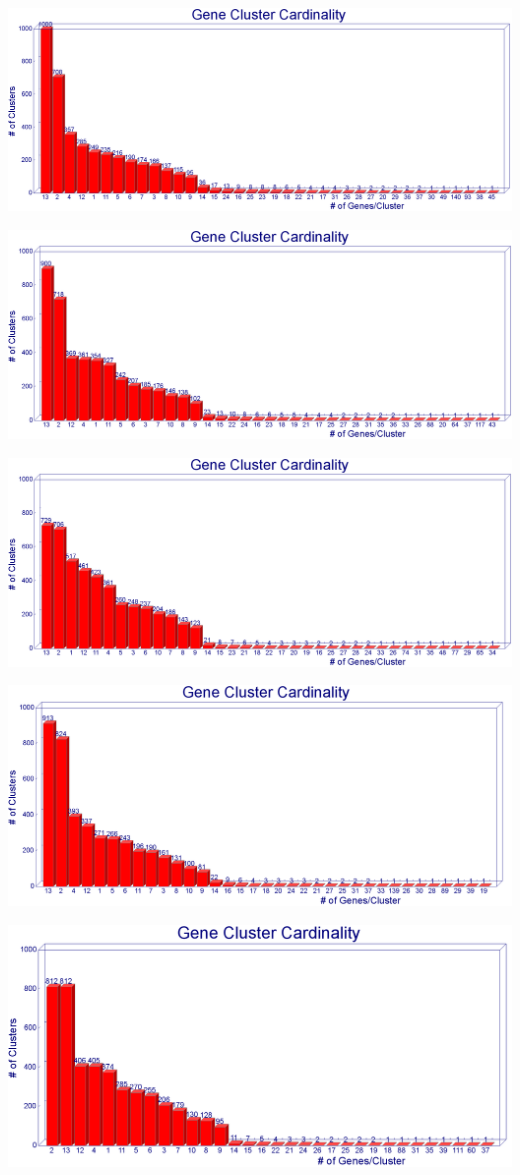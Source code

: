 \documentclass[11pt,notitlepage]{article}
\begin{document}
  \includegraphics[width=145mm]{i45_a50_graph.png}
  
  \includegraphics[width=145mm]{i45_a70_graph.png}
  
  \includegraphics[width=145mm]{i45_a90_graph.png}
  
  \includegraphics[width=145mm]{i60_a50_graph.png}
  
  \includegraphics[width=145mm]{i60_a70_graph.png}
  
\end{document}
